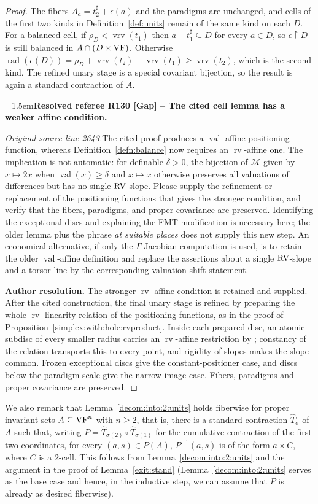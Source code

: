 \documentclass[12pt]{amsart}
\newcommand{\ResolvedRefereeRemark}[5]{%
  \par\medskip\begingroup\normalfont\small\color{gray}%
  \emergencystretch=1.5em\noindent\textbf{Resolved referee R#1 [#2] -- #3.}\par\nobreak\noindent #4\par
  \medskip\color{ResolutionGreen}\noindent\textbf{Author resolution.} #5\par
  \endgroup\medskip
}
\theoremstyle{plain}
\theoremstyle{definition}
\theoremstyle{remark}
\numberwithin{equation}{section}
\theoremstyle{plain}
\newcommand{\VF}{\textup{VF}}
\newcommand{\RV}{\textup{RV}}
\newcommand{\MM}{\mdl M}
\newcommand{\0}{\emptyset}
\newcommand{\mdl}[1]{\mathcal{#1}}  %
\newcommand{\rest}{\upharpoonright}
\newcommand{\sub}{\subseteq}
\DeclareMathOperator{\rv}{rv}
\DeclareMathOperator{\vv}{val}
\DeclareMathOperator{\rad}{rad}
\DeclareMathOperator{\vrv}{vrv}
\begin{document}
\begin{proof}
The fibers $A_a = t_2^\sharp + \epsilon(a)$ and the paradigms are unchanged, and cells of the first two kinds in Definition~\ref{def:units} remain of the same kind on each $D$. For a balanced cell, if $\rho_D < \vrv(t_1)$ then $a - t_1^\sharp \sub D$ for every $a \in D$, so $\epsilon \rest D$ is still balanced in $A \cap (D \times \VF)$. Otherwise $\rad(\epsilon(D)) = \rho_D + \vrv(t_2) - \vrv(t_1) \geq \vrv(t_2)$, which is the second kind. The refined unary stage is a special covariant bijection, so the result is again a standard contraction of $A$.

\ResolvedRefereeRemark{130}{Gap}{The cited cell lemma has a weaker affine condition}{%
\textit{Original source line 2643.}\quad The cited proof produces a $\vv$-affine positioning function, whereas Definition~\ref{defn:balance} now requires an $\rv$-affine one. The implication is not automatic: for definable $\delta>0$, the bijection of $\MM$ given by $x\mapsto2x$ when $\vv(x)\geq\delta$ and $x\mapsto x$ otherwise preserves all valuations of differences but has no single $\RV$-slope. Please supply the refinement or replacement of the positioning functions that gives the stronger condition, and verify that the fibers, paradigms, and proper covariance are preserved. Identifying the exceptional discs and explaining the FMT modification is necessary here; the older lemma plus the phrase \emph{at suitable places} does not supply this new step. An economical alternative, if only the $\Gamma$-Jacobian computation is used, is to retain the older $\vv$-affine definition and replace the assertions about a single $\RV$-slope and a torsor line by the corresponding valuation-shift statement.
}{The stronger $\rv$-affine condition is retained and supplied. After the cited construction, the final unary stage is refined by preparing the whole $\rv$-linearity relation of the positioning functions, as in the proof of Proposition~\ref{simplex:with:hole:rvproduct}. Inside each prepared disc, an atomic subdisc of every smaller radius carries an $\rv$-affine restriction by \cite[Lemma~3.18]{Yin:int:acvf}; constancy of the relation transports this to every point, and rigidity of slopes makes the slope common. Frozen exceptional discs give the constant-positioner case, and discs below the paradigm scale give the narrow-image case. Fibers, paradigms and proper covariance are preserved.}
\end{proof}

We also remark that Lemma~\ref{decom:into:2:units} holds fiberwise for proper invariant sets $A \sub \VF^n$ with $n \geq 2$, that is, there is a standard contraction $\hat T_\sigma$ of $A$ such that, writing $P = \hat T_{\sigma(2)} \circ \hat T_{\sigma(1)}$ for the cumulative contraction of the first two coordinates, for every $(a, s) \in P(A)$, $P^{-1}(a, s)$ is of the form $a \times C$, where $C$ is a $2$-cell. This follows from Lemma~\ref{decom:into:2:units} and the argument in the proof of  Lemma~\ref{exit:stand} (Lemma~\ref{decom:into:2:units} serves as the base case and hence, in the inductive step, we can assume that $P$ is already as desired fiberwise).
\end{document}
